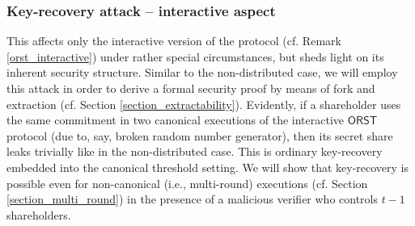 \documentclass{iacrtrans}
\begin{document}
\subsubsection{Key-recovery attack -- interactive aspect}\label{section_key_recovery_attack}
This affects only
the interactive version of the protocol
(cf. Remark \ref{orst_interactive})
under rather special circumstances,
but sheds light on its inherent security structure.
Similar to the non-distributed case,
we will employ this attack in order to derive
a formal security proof by means of fork and extraction
(cf. Section \ref{section_extractability}).
Evidently, if a shareholder uses the same commitment
in two canonical executions of the interactive $\mathsf{ORST}$ protocol
(due to, say, broken random  number generator),
then its secret share leaks trivially
like in the non-distributed case.
This is ordinary key-recovery
embedded into the canonical threshold setting.
We will show that key-recovery
is possible even for non-canonical (i.e., multi-round) executions
(cf. Section \ref{section_multi_round})
in the presence of a malicious verifier who controls $t-1$ shareholders.
\end{document}
